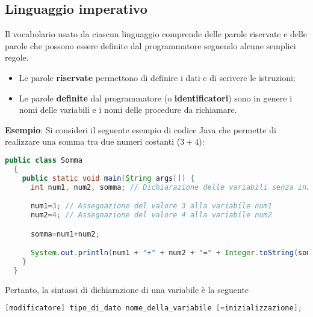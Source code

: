 \documentclass[a4paper]{extarticle}
\begin{document}
\vspace{1em}
\subsection{Linguaggio imperativo}
Il vocabolario usato da ciascun linguaggio comprende delle parole riservate e delle parole che possono essere definite dal programmatore seguendo alcune semplici regole.
\begin{itemize}
  \item Le parole \textbf{riservate} permettono di definire i dati e di scrivere le istruzioni;
  \item Le parole \textbf{definite} dal programmatore (o \textbf{identificatori}) sono in genere i nomi delle variabili e i nomi delle procedure da richiamare.
\end{itemize}

\vspace{1em}
\noindent
\textbf{Esempio}: Si consideri il seguente esempio di codice Java che permette di realizzare una somma tra due numeri costanti ($3+4$):

\begin{lstlisting}[language=Java, caption=Somma di due numeri costanti in Java]
  public class Somma
  {
    public static void main(String args[]) {
      int num1, num2, somma; // Dichiarazione delle variabili senza inzializzazione

      num1=3; // Assegnazione del valore 3 alla variabile num1
      num2=4; // Assegnazione del valore 4 alla variabile num2

      somma=num1+num2;

      System.out.println(num1 + "+" + num2 + "=" + Integer.toString(somma));
    }
  }
\end{lstlisting}

\vspace{1em}
\noindent
Pertanto, la sintassi di dichiarazione di una variabile è la seguente

\begin{lstlisting}[language=Java, caption=Dichiarazione di una variabile in Java]
  [modificatore] tipo_di_dato nome_della_variabile [=inizializzazione];
\end{lstlisting}
\end{document}

